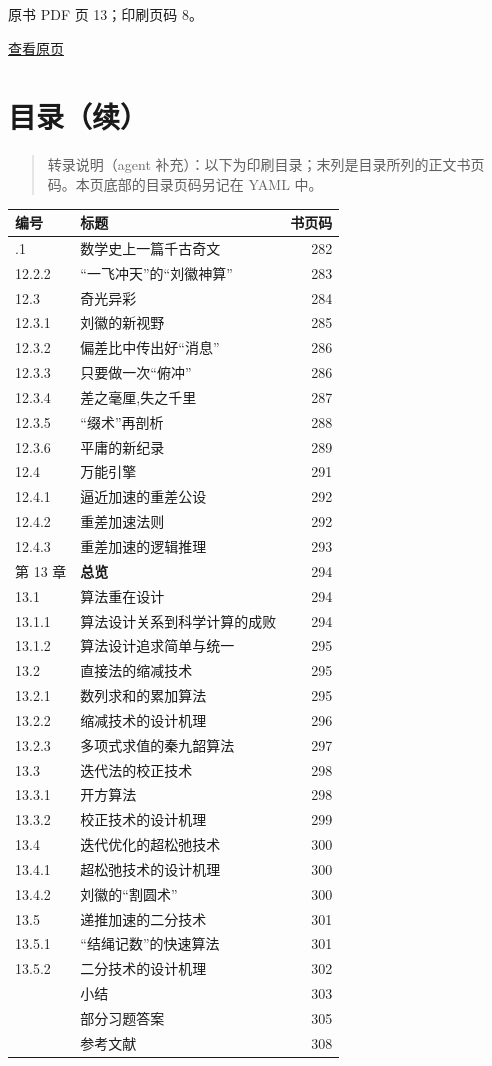 \clearpage

原书 PDF 页 13；印刷页码 8。

\href{source-images/pdf-013.jpeg}{查看原页}

\section{目录（续）}\label{front-ux76eeux5f55ux7eed-6}

\begin{quote}
转录说明（agent 补充）：以下为印刷目录；末列是目录所列的正文书页码。本页底部的目录页码另记在 YAML 中。
\end{quote}

{\def\LTcaptype{none} %
\begin{longtable}[]{@{}llr@{}}
\toprule\noalign{}
编号 & 标题 & 书页码 \\
\midrule\noalign{}
\endhead
\bottomrule\noalign{}
\endlastfoot
12.2.1 & 数学史上一篇千古奇文 & 282 \\
12.2.2 & ``一飞冲天''的``刘徽神算'' & 283 \\
12.3 & 奇光异彩 & 284 \\
12.3.1 & 刘徽的新视野 & 285 \\
12.3.2 & 偏差比中传出好``消息'' & 286 \\
12.3.3 & 只要做一次``俯冲'' & 286 \\
12.3.4 & 差之毫厘,失之千里 & 287 \\
12.3.5 & ``缀术''再剖析 & 288 \\
12.3.6 & 平庸的新纪录 & 289 \\
12.4 & 万能引擎 & 291 \\
12.4.1 & 逼近加速的重差公设 & 292 \\
12.4.2 & 重差加速法则 & 292 \\
12.4.3 & 重差加速的逻辑推理 & 293 \\
第 13 章 & \textbf{总览} & 294 \\
13.1 & 算法重在设计 & 294 \\
13.1.1 & 算法设计关系到科学计算的成败 & 294 \\
13.1.2 & 算法设计追求简单与统一 & 295 \\
13.2 & 直接法的缩减技术 & 295 \\
13.2.1 & 数列求和的累加算法 & 295 \\
13.2.2 & 缩减技术的设计机理 & 296 \\
13.2.3 & 多项式求值的秦九韶算法 & 297 \\
13.3 & 迭代法的校正技术 & 298 \\
13.3.1 & 开方算法 & 298 \\
13.3.2 & 校正技术的设计机理 & 299 \\
13.4 & 迭代优化的超松弛技术 & 300 \\
13.4.1 & 超松弛技术的设计机理 & 300 \\
13.4.2 & 刘徽的``割圆术'' & 300 \\
13.5 & 递推加速的二分技术 & 301 \\
13.5.1 & ``结绳记数''的快速算法 & 301 \\
13.5.2 & 二分技术的设计机理 & 302 \\
& 小结 & 303 \\
& 部分习题答案 & 305 \\
& 参考文献 & 308 \\
\end{longtable}
}

